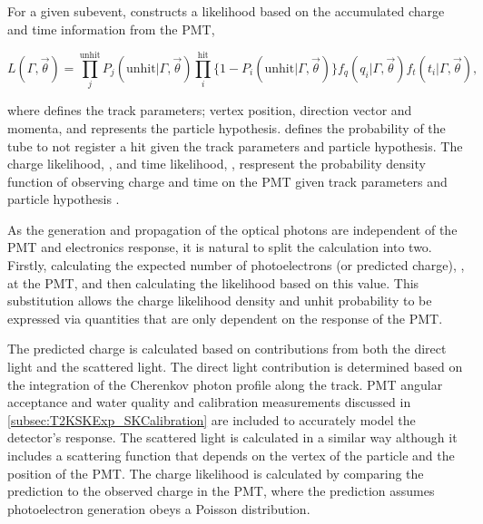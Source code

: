 For a given subevent, \fq constructs a likelihood based on the accumulated charge  and time information  from the  PMT,

\begin{equation}
  L(\Gamma, \vec{\theta}) = \prod^{\text{unhit}}_{j} P_{j}(\text{unhit}|\Gamma,\vec{\theta}) \prod^{\text{hit}}_{i} \{ 1 - P_{i}(\text{unhit}|\Gamma,\vec{\theta}) \}   f_{q}(q_{i} | \Gamma, \vec{\theta}) f_{t}(t_{i} | \Gamma, \vec{\theta}),
\end{equation}

where \quickmath{\vec{\theta}} defines the track parameters; vertex position, direction vector and momenta, and \quickmath{\Gamma} represents the particle hypothesis.  defines the probability of the  tube to not register a hit given the track parameters and particle hypothesis. The charge likelihood, , and time likelihood, , respresent the probability density function of observing charge  and time  on the  PMT given track parameters \quickmath{\vec{\theta}} and particle hypothesis \quickmath{\Gamma}.

As the generation and propagation of the optical photons are independent of the PMT and electronics response, it is natural to split the calculation into two. Firstly, calculating the expected number of photoelectrons (or predicted charge), , at the  PMT, and then calculating the likelihood based on this value. This substitution allows the charge likelihood density  and unhit probability  to be expressed via quantities that are only dependent on the response of the PMT. 

The predicted charge is calculated based on contributions from both the direct light and the scattered light. The direct light contribution is determined based on the integration of the Cherenkov photon profile along the track. PMT angular acceptance and water quality and calibration measurements discussed in \autoref{subsec:T2KSKExp_SKCalibration} are included to accurately model the detector's response. The scattered light is calculated in a similar way although it includes a scattering function that depends on the vertex of the particle and the position of the PMT. The charge likelihood is calculated by comparing the prediction to the observed charge in the PMT, where the prediction assumes photoelectron generation obeys a Poisson distribution.

